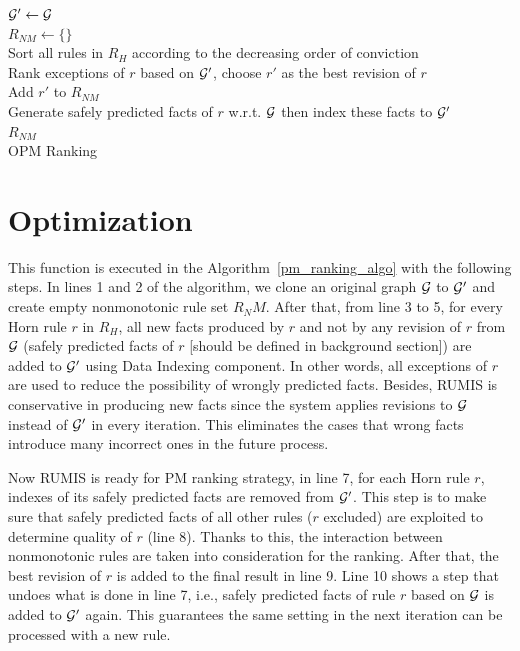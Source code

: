 \IncMargin{1.5em}
\begin{algorithm}[H]
\DontPrintSemicolon
\SetAlgoLined
{}
\BlankLine
$\mathcal{G}' \leftarrow \mathcal{G}$\\
$R_{NM} \leftarrow \{\}$\\
Sort all rules in $R_H$ according to the decreasing order of conviction\\
\BlankLine
{} {
	Rank exceptions of $r$ based on $\mathcal{G}'$, choose $r'$ as the best revision of $r$\\
	Add $r'$ to $R_{NM}$\\
	Generate safely predicted facts of $r$ w.r.t. $\mathcal{G}$ then index these facts to $\mathcal{G}'$\\
}
\Return $R_{NM}$\\
\caption{OPM Ranking}
\label{opm_ranking_algo}
\end{algorithm}
\DecMargin{1.5em}

\section{Optimization}

This function is executed in the Algorithm~\ref{pm_ranking_algo} with the following steps. In lines 1 and 2 of the algorithm, we clone an original graph $\mathcal{G}$ to $\mathcal{G}'$ and create empty nonmonotonic rule set $R_NM$. After that, from line 3 to 5, for every Horn rule $r$ in $R_H$, all new facts produced by $r$ and not by any revision of $r$ from $\mathcal{G}$ (safely predicted facts of $r$ [should be defined in background section]) are added to $\mathcal{G}'$ using Data Indexing component. In other words, all exceptions of $r$ are used to reduce the possibility of wrongly predicted facts. Besides, RUMIS is conservative in producing new facts since the system applies revisions to $\mathcal{G}$ instead of $\mathcal{G}'$ in every iteration. This eliminates the cases that wrong facts introduce many incorrect ones in the future process. 

Now RUMIS is ready for PM ranking strategy, in line 7, for each Horn rule $r$, indexes of its safely predicted facts are removed from $\mathcal{G}'$. This step is to make sure that safely predicted facts of all other rules ($r$ excluded) are exploited to determine quality of $r$ (line 8). Thanks to this, the interaction between nonmonotonic rules are taken into consideration for the ranking. After that, the best revision of $r$ is added to the final result in line 9. Line 10 shows a step that undoes what is done in line 7, i.e., safely predicted facts of rule $r$ based on $\mathcal{G}$ is added to $\mathcal{G}'$ again. This guarantees the same setting in the next iteration can be processed with a new rule.

